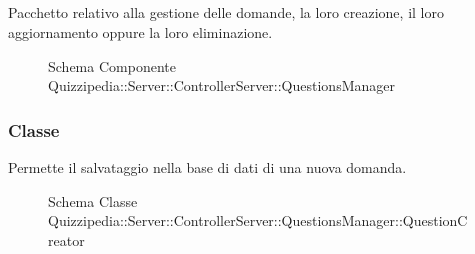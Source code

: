 \subsection{}
Pacchetto relativo alla gestione delle domande, la loro creazione, il loro aggiornamento oppure la loro eliminazione.
\begin{figure}[H]
\centering
\noindent{}
\caption[Schema Componente Quizzipedia::Server::ControllerServer::QuestionsManager]{Schema Componente Quizzipedia::Server::ControllerServer::QuestionsManager}
\end{figure}
\subsubsection{Classe }
Permette il salvataggio nella base di dati di una nuova domanda.
\begin{figure}[H]
\centering
\noindent{}
\caption[Schema Classe QuestionCreator]{Schema Classe Quizzipedia::Server::ControllerServer::QuestionsManager::QuestionCreator}
\end{figure}
